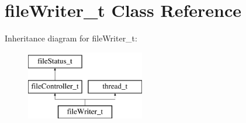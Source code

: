 \hypertarget{classfileWriter__t}{\section{file\-Writer\-\_\-t \-Class \-Reference}
\label{classfileWriter__t}
}
\-Inheritance diagram for file\-Writer\-\_\-t\-:\begin{figure}[H]
\begin{center}
\leavevmode
\includegraphics[height=3.000000cm]{classfileWriter__t}
\end{center}
\end{figure}

